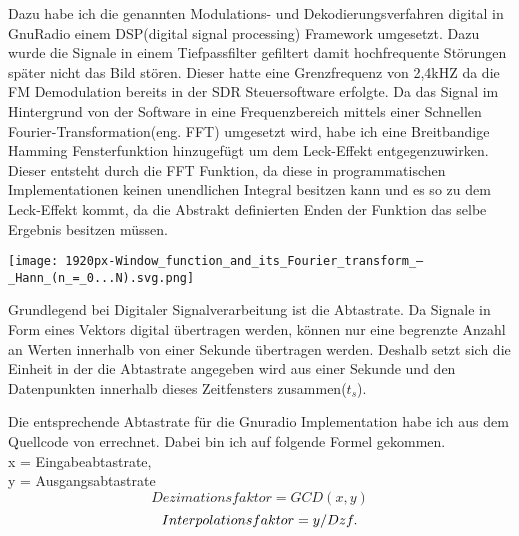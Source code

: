 \begin{multicols*}{2}
    Dazu habe ich die genannten Modulations- und Dekodierungsverfahren digital in GnuRadio \cite[]{Gnuradio} einem DSP(digital signal processing) Framework umgesetzt. Dazu wurde die Signale in einem Tiefpassfilter gefiltert damit hochfrequente Störungen später nicht das Bild stören. Dieser hatte eine Grenzfrequenz von 2,4kHZ da die FM Demodulation bereits in der SDR Steuersoftware erfolgte. Da das Signal im Hintergrund von der Software in eine Frequenzbereich mittels einer Schnellen Fourier-Transformation(eng. FFT) umgesetzt wird, habe ich eine Breitbandige Hamming Fensterfunktion hinzugefügt um dem Leck-Effekt entgegenzuwirken. Dieser entsteht durch die FFT Funktion, da diese in programmatischen Implementationen keinen unendlichen Integral besitzen kann und es so zu dem Leck-Effekt kommt, da die Abstrakt definierten Enden der Funktion das selbe Ergebnis besitzen müssen.

    \begin{center}
        \centering
        \texttt{[image: 1920px-Window\_function\_and\_its\_Fourier\_transform\_–\_Hann\_(n\_=\_0...N).svg.png]}
    \end{center} 
    
    Grundlegend bei Digitaler Signalverarbeitung ist die Abtastrate. Da Signale in Form eines Vektors digital übertragen werden, können nur eine begrenzte Anzahl an Werten innerhalb von einer Sekunde übertragen werden. Deshalb setzt sich die Einheit in der die Abtastrate angegeben wird aus einer Sekunde und den Datenpunkten innerhalb dieses Zeitfensters zusammen(\( t_s \)).

    Die entsprechende Abtastrate für die Gnuradio Implementation habe ich aus dem Quellcode von \cite{APT-How_it_works} errechnet. Dabei bin ich auf folgende Formel gekommen.
    \\
    x = Eingabeabtastrate,\\ y = Ausgangsabtastrate
    \begin{equation}
        Dezimationsfaktor = GCD(x,y) 
    \end{equation}
    \begin{equation}
        Interpolationsfaktor = y / Dzf. \\
    \end{equation}
    


\end{multicols*}
